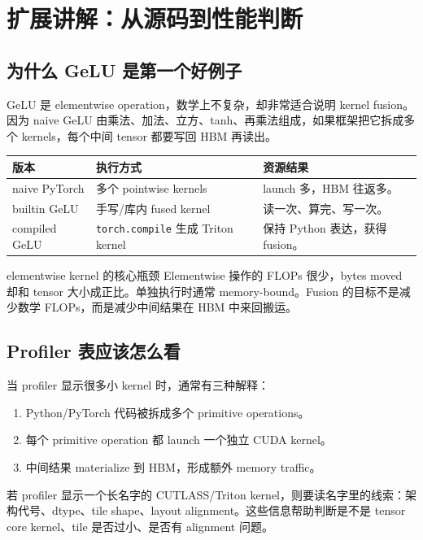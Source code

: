 \section{扩展讲解：从源码到性能判断}

\subsection{为什么 GeLU 是第一个好例子}

GeLU 是 elementwise operation，数学上不复杂，却非常适合说明 kernel fusion。因为 naive GeLU 由乘法、加法、立方、tanh、再乘法组成，如果框架把它拆成多个 kernels，每个中间 tensor 都要写回 HBM 再读出。

\begin{longtable}{p{}p{}p{}}
\toprule
\textbf{版本} & \textbf{执行方式} & \textbf{资源结果} \\
\midrule
naive PyTorch & 多个 pointwise kernels & launch 多，HBM 往返多。 \\
builtin GeLU & 手写/库内 fused kernel & 读一次、算完、写一次。 \\
compiled GeLU & \texttt{torch.compile} 生成 Triton kernel & 保持 Python 表达，获得 fusion。 \\
\bottomrule
\end{longtable}

\begin{importantbox}{elementwise kernel 的核心瓶颈}
Elementwise 操作的 FLOPs 很少，bytes moved 却和 tensor 大小成正比。单独执行时通常 memory-bound。Fusion 的目标不是减少数学 FLOPs，而是减少中间结果在 HBM 中来回搬运。
\end{importantbox}

\subsection{Profiler 表应该怎么看}

当 profiler 显示很多小 kernel 时，通常有三种解释：

\begin{enumerate}
    \item Python/PyTorch 代码被拆成多个 primitive operations。
    \item 每个 primitive operation 都 launch 一个独立 CUDA kernel。
    \item 中间结果 materialize 到 HBM，形成额外 memory traffic。
\end{enumerate}

若 profiler 显示一个长名字的 CUTLASS/Triton kernel，则要读名字里的线索：架构代号、dtype、tile shape、layout alignment。这些信息帮助判断是不是 tensor core kernel、tile 是否过小、是否有 alignment 问题。


